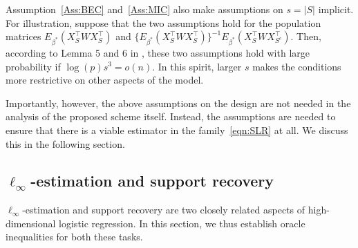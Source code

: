 \documentclass{elsarticle}
\newcommand{\oldnew}{}
\begin{document}
{\oldnew Assumption~\ref{Ass:BEC} and~\ref{Ass:MIC} also make assumptions on $s=|S|$ implicit.
For illustration, suppose that the two assumptions hold for the population matrices $E_{\beta^*}(X_S^{\top} WX_S^{\top})$ and $\big\{E_{\beta^*}(X_S^{\top} WX_S^{\top})\big\}^{-1}E_{\beta^*}(X_S^{\top} WX_{S^c}^{\top})$. Then, according to Lemma 5 and 6 in \cite{ravikumar2010high}, these two assumptions hold with large probability if $\log(p)s^3=o(n)$. In this spirit, larger $s$ makes the conditions more restrictive on other aspects of the model.}

Importantly, however, the above assumptions on the design are not needed in the analysis of the proposed scheme itself. Instead, the assumptions are needed to ensure that there is a viable estimator in the family~\eqref{eqn:SLR} at all. We discuss this in the following section.

\subsection{$\ell_{\infty}$-estimation and support recovery}\label{subsec:boundandsr}

$\ell_{\infty}$-estimation and support recovery  are two closely related aspects of high-dimensional logistic regression. In this section, we thus establish oracle inequalities for both these tasks.
\end{document}
